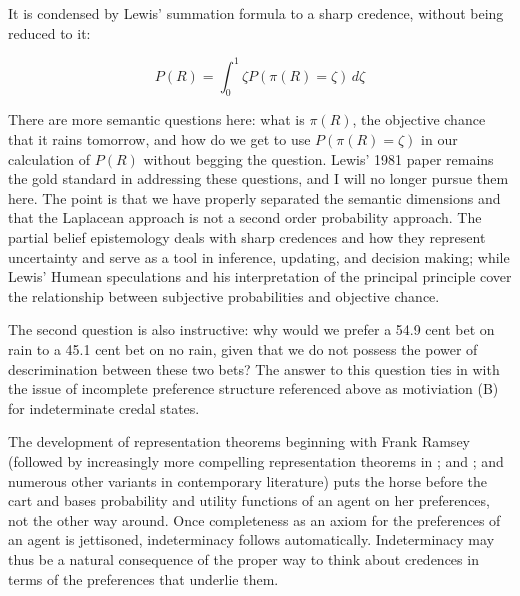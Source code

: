 It is condensed by Lewis' summation formula to a sharp
credence, without being reduced to it:

\begin{equation}
  \label{eq:s2}
  P(R)=\int_{0}^{1}\zeta{}P(\pi(R)=\zeta)\,d\zeta
\end{equation}

There are more semantic questions here: what is
$\pi(R)$, the objective chance that it rains tomorrow,
and how do we get to use $P(\pi(R)=\zeta)$ in our
calculation of $P(R)$ without begging the question.
Lewis' 1981 paper  remains the gold standard in
addressing these questions, and I will no longer pursue
them here. The point is that we have properly separated
the semantic dimensions and that the Laplacean approach
is not a second order probability approach. The partial
belief epistemology deals with sharp credences and how
they represent uncertainty and serve as a tool in
inference, updating, and decision making; while Lewis'
Humean speculations and his interpretation of the
principal principle cover the relationship between
subjective probabilities and objective chance.

The second question is also instructive: why would we
prefer a 54.9 cent bet on rain to a 45.1 cent bet on no
rain, given that we do not possess the power of
descrimination between these two bets? The answer to
this question ties in with the issue of incomplete
preference structure referenced above as motiviation
(B) for indeterminate credal states.

The development of representation theorems beginning
with Frank Ramsey (followed by increasingly more
compelling representation theorems in
; and ; and
numerous other variants in contemporary literature)
puts the horse before the cart and bases probability
and utility functions of an agent on her preferences,
not the other way around. Once completeness as an axiom
for the preferences of an agent is jettisoned,
indeterminacy follows automatically. Indeterminacy may
thus be a natural consequence of the proper way to
think about credences in terms of the preferences that
underlie them.


